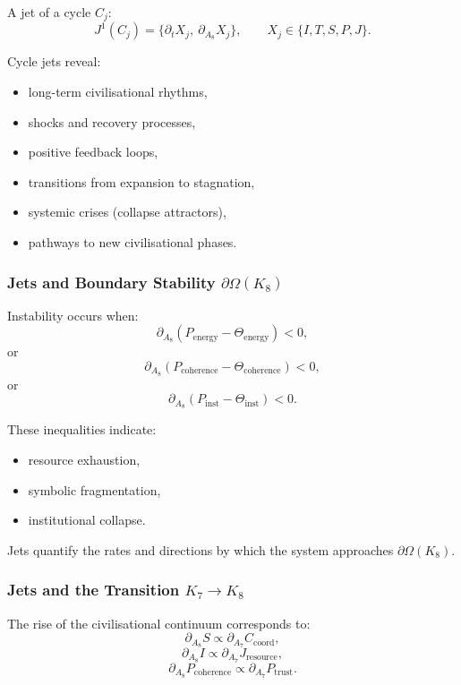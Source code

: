 A jet of a cycle $C_j$:
\[
J^1(C_j)=
\{\partial_t X_j,\ \partial_{A_8}X_j\},
\qquad
X_j\in\{I,T,S,P,J\}.
\]

Cycle jets reveal:
\begin{itemize}
    \item long-term civilisational rhythms,
    \item shocks and recovery processes,
    \item positive feedback loops,
    \item transitions from expansion to stagnation,
    \item systemic crises (collapse attractors),
    \item pathways to new civilisational phases.
\end{itemize}


\subsubsection{Jets and Boundary Stability \texorpdfstring{$\partial\Omega(K_8)$}{\partial\Omega(K_8)}}

Instability occurs when:
\[
\partial_{A_8}(P_{\mathrm{energy}} - \Theta_{\mathrm{energy}})<0,
\]
or
\[
\partial_{A_8}(P_{\mathrm{coherence}} - \Theta_{\mathrm{coherence}})<0,
\]
or
\[
\partial_{A_8}(P_{\mathrm{inst}} - \Theta_{\mathrm{inst}})<0.
\]

These inequalities indicate:
\begin{itemize}
    \item resource exhaustion,
    \item symbolic fragmentation,
    \item institutional collapse.
\end{itemize}

Jets quantify the rates and directions by which the system approaches
$\partial\Omega(K_8)$.


\subsubsection{Jets and the Transition \texorpdfstring{$K_7 \to K_8$}{K_7 \to K_8}}

The rise of the civilisational continuum corresponds to:
\[
\partial_{A_8}S
\propto
\partial_{A_7}C_{\mathrm{coord}},
\]
\[
\partial_{A_8}I
\propto
\partial_{A_7}J_{\mathrm{resource}},
\]
\[
\partial_{A_8}P_{\mathrm{coherence}}
\propto
\partial_{A_7}P_{\mathrm{trust}}.
\]

